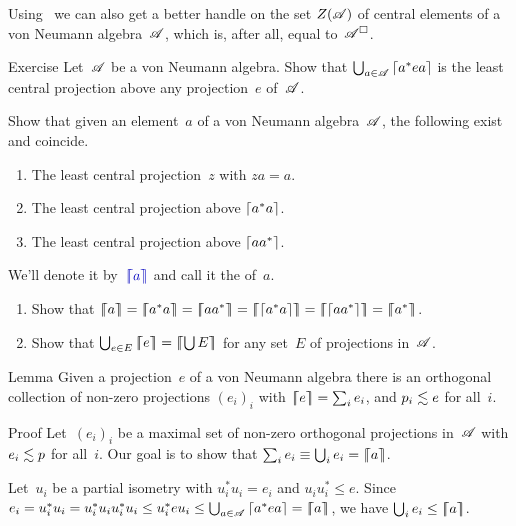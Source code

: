 \documentclass[a]{subfiles}
\begin{document}
\begin{parsec}%
\begin{point}%
Using~
we can also get a better handle on the set 
$Z(\mathscr{A})$ of central elements
of a von Neumann algebra~$\mathscr{A}$,
which is, after all, equal to~$\mathscr{A}^\square$.
\end{point}
\begin{point}{Exercise}%
Let~$\mathscr{A}$ be a von Neumann algebra.
Show that
$\bigcup_{a\in\mathscr{A}}\left\lceil a^*ea\right\rceil$
is the least central projection above any projection~$e$
of~$\mathscr{A}$.
\begin{point}%
Show that given an element~$a$ of a von Neumann algebra~$\mathscr{A}$,
the following exist and coincide.
\begin{enumerate}
\item
The least central projection~$z$ with $za=a$.
\item
The least central projection above $\left\lceil a^*a\right\rceil$.
\item
The least central projection above $\left\lceil aa^*\right\rceil$.
\end{enumerate}
We'll denote it by~$\Define{\cceil{a}}$
and call it the  of~$a$.
\end{point}
\begin{point}
\begin{enumerate}
\item
Show that
$\cceil{a}=\cceil{a^*a}=\cceil{aa^*}
= \cceil{\ceil{a^*a}}=\cceil{\ceil{aa^*}}=\cceil{a^*}$.
\item
Show that $\bigcup_{e\in E} \cceil{e}
= \cceil{\bigcup E}$
for any set~$E$ of projections in~$\mathscr{A}$.
\end{enumerate}
\end{point}
\end{point}
\begin{point}{Lemma}%
Given a projection~$e$
of a von Neumann algebra
there is an orthogonal collection of non-zero projections
$(e_i)_i$ with $\left\lceil\!\!\left\lceil e\right\rceil\!\!\right\rceil=\sum_i e_i$,
and $p_i\vmleq e$ for all~$i$.

\begin{point}{Proof}%
Let~$(e_i)_i$
be a maximal set of non-zero orthogonal projections
in~$\mathscr{A}$ with
$e_i\vmleq p$ for all~$i$.
Our goal is to show that $\sum_i e_i \equiv \bigcup_i e_i=\left\lceil\!\!\left\lceil a\right\rceil\!\!\right\rceil$.

Let~$u_i$ be a partial isometry
with $u_i^*u_i=e_i$ and $u_iu_i^* \leq e$.
Since $e_i=u_i^* u_i = u_i^* u_i u_i^* u_i
\leq u_i^* e u_i 
\leq \bigcup_{a\in \mathscr{A}} \left\lceil a^* e a\right\rceil=\left\lceil\!\!\left\lceil a\right\rceil\!\!\right\rceil$,
we have
$\bigcup_i e_i \leq \left\lceil\!\!\left\lceil a\right\rceil\!\!\right\rceil$.


\end{point}
\end{point}
\end{parsec}
\end{document}

